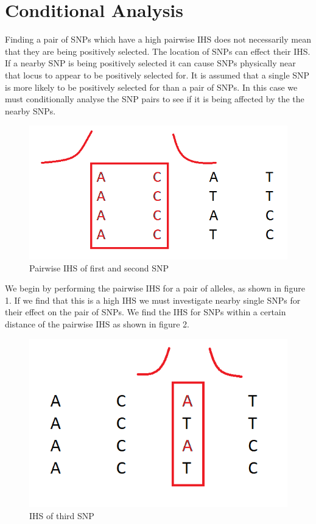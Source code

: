 \documentclass[a4paper,12pt]{report}
\begin{document}
\section{Conditional Analysis}
Finding a pair of SNPs which have a high pairwise IHS does not necessarily mean that they are being positively selected. The location of SNPs can effect their IHS. If a nearby SNP is being positively selected it can cause SNPs physically near that locus to appear to be positively selected for. It is assumed that a single SNP is more likely to be positively selected for than a pair of SNPs. In this case we must conditionally analyse the SNP pairs to see if it is being affected by the the nearby SNPs. 

\begin{figure}[h!]
  \centering
    \includegraphics[scale=0.5]{conditional1}
  \caption{Pairwise IHS of first and second SNP}
\end{figure}

We begin by performing the pairwise IHS for a pair of alleles, as shown in figure 1. If we find that this is a high IHS we must investigate nearby single SNPs for their effect on the pair of SNPs. We find the IHS for SNPs within a certain distance of the pairwise IHS as shown in figure 2.

\begin{figure}[h!]
  \centering
    \includegraphics[scale=0.5]{conditional2}
  \caption{IHS of third SNP}
\end{figure}
\end{document}
